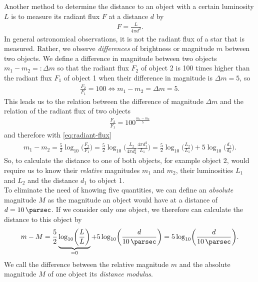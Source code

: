 Another method to determine the distance to an object with a certain luminosity $L$ is to measure its radiant flux $F$ at a distance $d$ by
\begin{align}
    F = \frac{L}{4\pi d^2}. \label{eq:radiant-flux} 
\end{align}
In general astronomical observations, it is not the radiant flux of a star that is measured. Rather, we observe \textit{differences} of brightness or magnitude $m$ between two objects. We define a difference in magnitude between two objects $m_{1} - m_{2} =: \Delta m$ so that the radiant flux $F_{2}$ of object 2 is 100 times higher than the radiant flux $F_{1}$ of object 1 when their difference in magnitude is $\Delta m = 5$, so 
\begin{align}
    \frac{F_{2}}{F_{1}} = 100 \Leftrightarrow m_{1} - m_{2} = \Delta m = 5.
\end{align}
This leads us to the relation between the difference of magnitude $\Delta m$ and the relation of the radiant flux of two objects
\begin{align}
    \frac{F_{2}}{F_{1}} = 100^{\frac{m_{1} - m_{2}}{5}} 
\end{align}
and therefore with \eqref{eq:radiant-flux}
\begin{align}
    m_{1} - m_{2} = \frac{5}{2} \log_{10} \biggl( \frac{F_{2}}{F_{1}} \biggr) = \frac{5}{2} \log_{10} \biggl( \frac{L_{2}}{4\pi d_{2}^2} \frac{4\pi d_{1}^2}{L_{1}} \biggr) = \frac{5}{2} \log_{10} \biggl( \frac{L_{2}}{L_{1}} \biggr) + 5 \log_{10} \biggl( \frac{d_{1}}{d_{2}} \biggr). \label{eq:rel-magnitude-distance-relation} 
\end{align}
So, to calculate the distance to one of both objects, for example object 2, would require us to know their \textit{relative} magnitudes $m_{1}$ and $m_{2}$, their luminosities $L_{1}$ and $L_{2}$ and the distance $d_{1}$ to object 1. \\
To eliminate the need of knowing five quantities, we can define an \textit{absolute} magnitude $M$ as the magnitude an object would have at a distance of $d = \SI{10}{\parsec}$. If we consider only one object, we therefore can calculate the distance to this object by
\begin{align}
    m - M = \frac{5}{2} \underbrace{\log_{10} \biggl( \frac{L}{L} \biggr)}_{ = 0} + 5 \log_{10} \biggl( \frac{d}{\SI{10}{\parsec}} \biggr) = 5 \log_{10} \biggl(\frac{d}{\SI{10}{\parsec}}\biggr). \label{eq:distance-modulus} 
\end{align}
We call the difference between the relative magnitude $m$ and the absolute magnitude $M$ of one object its \textit{distance modulus}. \\
